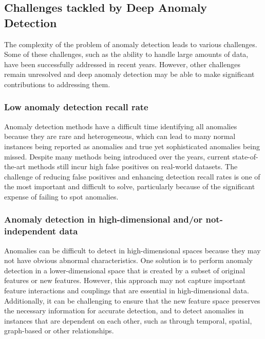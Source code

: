 \subsection{Challenges tackled by Deep Anomaly Detection}
The complexity of the problem of anomaly detection leads to various challenges. 
Some of these challenges, such as the ability to handle large amounts of data, have been successfully addressed in recent years. However, other challenges remain unresolved and deep anomaly detection may be able to make significant contributions to addressing them.

\subsubsection{Low anomaly detection recall rate}
Anomaly detection methods have a difficult time identifying all anomalies because they are rare and heterogeneous, which can lead to many normal instances being reported as anomalies and true yet sophisticated anomalies being missed. 
Despite many methods being introduced over the years, current state-of-the-art methods still incur high false positives on real-world datasets. The challenge of reducing false positives and enhancing detection recall rates is one of the most important and difficult to solve, particularly because of the significant expense of failing to spot anomalies.

\subsubsection{Anomaly detection in high-dimensional and/or not-independent data}
Anomalies can be difficult to detect in high-dimensional spaces because they may not have obvious abnormal characteristics. One solution is to perform anomaly detection in a lower-dimensional space that is created by a subset of original features or new features. However, this approach may not capture important feature interactions and couplings that are essential in high-dimensional data. Additionally, it can be challenging to ensure that the new feature space preserves the necessary information for accurate detection, and to detect anomalies in instances that are dependent on each other, such as through temporal, spatial, graph-based or other relationships.

